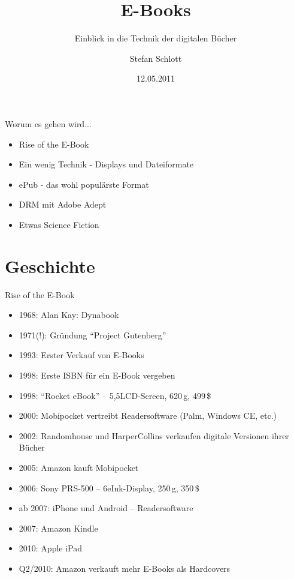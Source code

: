 \documentclass[hyperref={pdfpagelabels=false}]{beamer}
\title{E-Books}
\subtitle{Einblick in die Technik der digitalen Bücher}
\author{%
		Stefan Schlott%
}
\institute{%
	Web: \url{http://stefan.ploing.de/} \\
	Twitter: \href{https://twitter.com/\_skyr}{@\_skyr}
}
\date{12.05.2011}
\begin{document}
\begin{frame}[plain]
\titlepage
\end{frame}


\begin{frame}{Worum es gehen wird...}
	\begin{itemize}
		\item Rise of the E-Book
		\item Ein wenig Technik - Displays und Dateiformate
		\item ePub - das wohl populärste Format
		\item DRM mit Adobe Adept
		\item Etwas Science Fiction
	\end{itemize}
\end{frame}


\section{Geschichte}

\begin{frame}{Rise of the E-Book}
	\begin{itemize}
		\item 1968: Alan Kay: Dynabook%
		\item 1971(!): Gründung "`Project Gutenberg"'%
		\item 1993: Erster Verkauf von E-Books
		\item 1998: Erste ISBN für ein E-Book vergeben
		\item<2-> 1998: "`Rocket eBook"' -- 5,5\dq LCD-Screen, 620\,g, 499\,\$
		\item<2-> 2000: Mobipocket vertreibt Readersoftware (Palm, Windows CE, etc.)
		\item<2-> 2002: Randomhouse und HarperCollins verkaufen digitale Versionen ihrer Bücher
		\item<3-> 2005: Amazon kauft Mobipocket
		\item<3-> 2006: Sony PRS-500 -- 6\dq eInk-Display, 250\,g, 350\,\$
		\item<3-> ab 2007: iPhone und Android -- Readersoftware
		\item<3-> 2007: Amazon Kindle
		\item<4-> 2010: Apple iPad
		\item<4-> Q2/2010: Amazon verkauft mehr E-Books als Hardcovers
	\end{itemize}
\end{frame}
\end{document}
